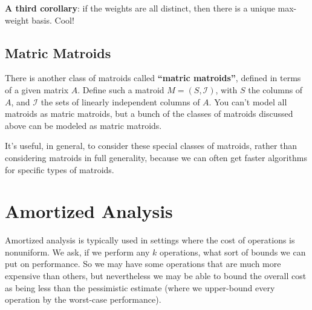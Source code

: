 \documentclass{article}
\newcommand{\I}{\mathcal{I}}
\begin{document}
\textbf{A third corollary}: if the weights are all distinct, then there
is a unique max-weight basis.
Cool!

\subsection{Matric Matroids}

There is another class of matroids called \textbf{``matric matroids''},
defined in terms of a given matrix $A$.
Define such a matroid $M=(S,\I)$, with $S$ the columns of $A$, and
$\I$ the sets of linearly independent columns of $A$.
You can't model all matroids as matric matroids, but a bunch of the classes
of matroids discussed above can be modeled as matric matroids.

It's useful, in general, to consider these special classes of matroids,
rather than considering matroids in full generality, because we can
often get faster algorithms for specific types of matroids.


\section{Amortized Analysis}

Amortized analysis is typically used in settings where the cost of
operations is nonuniform.
We ask, if we perform any $k$ operations, what sort
of bounds we can put on performance.
So we may have some operations that are much more expensive than others, but
nevertheless we may be able to bound the overall cost as being less than the 
pessimistic estimate (where we upper-bound
every operation by the worst-case performance).
\end{document}
